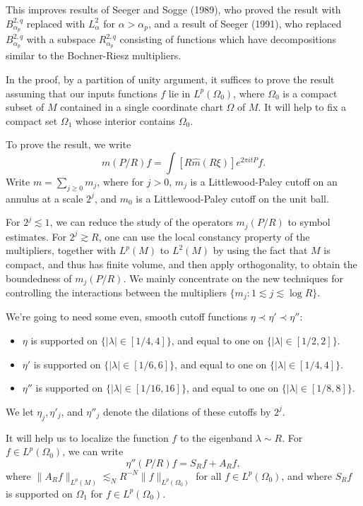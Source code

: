 This improves results of Seeger and Sogge (1989), who proved the result with $B^{2,q}_{\alpha_p}$ replaced with $L^2_\alpha$ for $\alpha > \alpha_p$, and a result of Seeger (1991), who replaced $B^{2,q}_{\alpha_p}$ with a subspace $R^{2,q}_{\alpha_p}$ consisting of functions which have decompositions similar to the Bochner-Riesz multipliers.

In the proof, by a partition of unity argument, it suffices to prove the result assuming that our inputs functions $f$ lie in $L^p(\Omega_0)$, where $\Omega_0$ is a compact subset of $M$ contained in a single coordinate chart $\Omega$ of $M$. It will help to fix a compact set $\Omega_1$ whose interior contains $\Omega_0$.

To prove the result, we write
%
\[ m(P / R) f = \int [R \widehat{m}(R\xi) ] e^{2 \pi i t P} f. \]
%
Write $m = \sum_{j \geq 0} m_j$, where for $j > 0$, $m_j$ is a Littlewood-Paley cutoff on an annulus at a scale $2^j$, and $m_0$ is a Littlewood-Paley cutoff on the unit ball.

For $2^j \lesssim 1$, we can reduce the study of the operators $m_j(P/R)$ to symbol estimates. For $2^j \gtrsim R$, one can use the local constancy property of the multipliers, together with $L^p(M)$ to $L^2(M)$ by using the fact that $M$ is compact, and thus has finite volume, and then apply orthogonality, to obtain the boundedness of $m_j(P/R)$. We mainly concentrate on the new techniques for controlling the interactions between the multipliers $\{ m_j : 1 \lesssim j \lesssim \log R \}$.

We're going to need some even, smooth cutoff functions $\eta \prec \eta' \prec \eta''$:
%
\begin{itemize}
    \item $\eta$ is supported on $\{ |\lambda| \in [1/4,4] \}$, and equal to one on $\{ |\lambda| \in [1/2,2] \}$.

    \item $\eta'$ is supported on $\{ |\lambda| \in [1/6,6] \}$, and equal to one on $\{ |\lambda| \in [1/4,4] \}$.

    \item $\eta''$ is supported on $\{ |\lambda| \in [1/16,16] \}$, and equal to one on $\{ |\lambda| \in [1/8,8] \}$.
\end{itemize}
%
We let $\eta_j, \eta'_j$, and $\eta''_j$ denote the dilations of these cutoffs by $2^j$.

It will help us to localize the function $f$ to the eigenband $\lambda \sim R$. For $f \in L^p(\Omega_0)$, we can write
%
\[ \eta''(P/R) f = S_R f + A_R f, \]
%
where $\| A_R f \|_{L^p(M)} \lesssim_N R^{-N} \| f \|_{L^p(\Omega_0)}$ for all $f \in L^p(\Omega_0)$, and where $S_R f$ is supported on $\Omega_1$ for $f \in L^p(\Omega_0)$.

